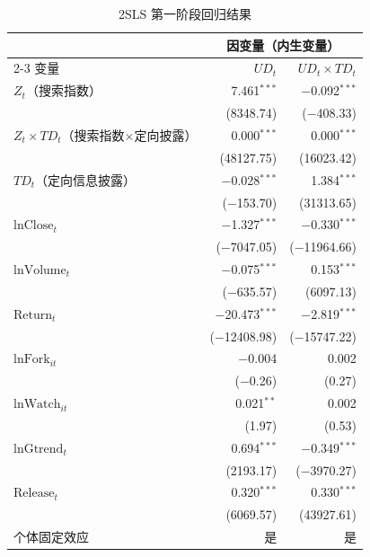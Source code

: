 \begin{table}[htbp]
    \centering
    \caption{2SLS 第一阶段回归结果}
    \label{tab:first-stage}
    \small
    \begin{tabularx}{\textwidth}{Xrr}
        \toprule
        & \multicolumn{2}{c}{因变量（内生变量）} \\
        \cmidrule(lr){2-3}
        变量
            & $UD_t$ & $UD_t \times TD_t$ \\
        \midrule
        $Z_t$（搜索指数）
            & 7.461$^{***}$ & $-$0.092$^{***}$ \\
            & (8348.74) & ($-$408.33) \\[0.4em]
        $Z_t \times TD_t$（搜索指数$\times$定向披露）
            & 0.000$^{***}$ & 0.000$^{***}$ \\
            & (48127.75) & (16023.42) \\[0.4em]
        $TD_t$（定向信息披露）
            & $-$0.028$^{***}$ & 1.384$^{***}$ \\
            & ($-$153.70) & (31313.65) \\[0.4em]
        $\text{lnClose}_t$
            & $-$1.327$^{***}$ & $-$0.330$^{***}$ \\
            & ($-$7047.05) & ($-$11964.66) \\[0.4em]
        $\text{lnVolume}_t$
            & $-$0.075$^{***}$ & 0.153$^{***}$ \\
            & ($-$635.57) & (6097.13) \\[0.4em]
        $\text{Return}_t$
            & $-$20.473$^{***}$ & $-$2.819$^{***}$ \\
            & ($-$12408.98) & ($-$15747.22) \\[0.4em]
        $\text{lnFork}_{it}$
            & $-$0.004 & 0.002 \\
            & ($-$0.26) & (0.27) \\[0.4em]
        $\text{lnWatch}_{it}$
            & 0.021$^{**}$ & 0.002 \\
            & (1.97) & (0.53) \\[0.4em]
        $\text{lnGtrend}_t$
            & 0.694$^{***}$ & $-$0.349$^{***}$ \\
            & (2193.17) & ($-$3970.27) \\[0.4em]
        $\text{Release}_t$
            & 0.320$^{***}$ & 0.330$^{***}$ \\
            & (6069.57) & (43927.61) \\
        \midrule
        个体固定效应 & 是 & 是 \\

\end{tabularx}
\end{table}
